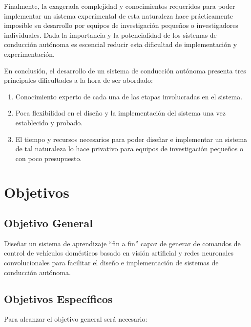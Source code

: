 Finalmente, la exagerada complejidad y conocimientos requeridos para poder implementar un sistema experimental 
de esta naturaleza hace prácticamente imposible su desarrollo por equipos de investigación pequeños o investigadores 
individuales. Dada la importancia y la potencialidad de los sistemas de conducción autónoma es escencial reducir 
esta dificultad de implementación y experimentación.

En conclusión, el desarrollo de un sistema de conducción autónoma presenta tres principales dificultades a la hora de 
ser abordado: 
\begin{enumerate}
    \item Conocimiento experto de cada una de las etapas involucradas en el sistema.
    \item Poca flexibilidad en el diseño y la implementación del sistema una vez establecido y probado.
    \item El tiempo y recursos necesarios para poder diseñar e implementar un sistema de tal naturaleza lo hace privativo para equipos de investigación pequeños o con poco presupuesto.
\end{enumerate}
\section{Objetivos}
\subsection{Objetivo General}

Diseñar un sistema de aprendizaje “fin a fin” capaz de generar de comandos de 
control de vehículos domésticos basado en visión artificial y redes neuronales 
convolucionales para facilitar el diseño e implementación de sistemas de conducción autónoma.

\subsection{Objetivos Específicos}
Para alcanzar el objetivo general será necesario:


